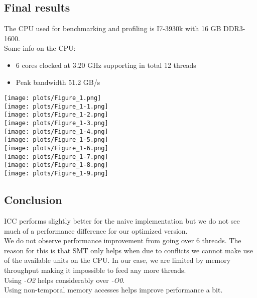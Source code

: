 \documentclass[10pt, fleqn]{article}
\begin{document}
\subsection{Final results}

The CPU used for benchmarking and profiling is I7-3930k with 16 GB DDR3-1600.\\
Some info on the CPU:\\
\begin{itemize}
\item 6 cores clocked at 3.20 GHz supporting in total 12 threads
\item Peak bandwidth 51.2 GB/s
\end{itemize}

\texttt{[image: plots/Figure\_1.png]}\\
\texttt{[image: plots/Figure\_1-1.png]}\\
\texttt{[image: plots/Figure\_1-2.png]}\\
\texttt{[image: plots/Figure\_1-3.png]}\\
\texttt{[image: plots/Figure\_1-4.png]}\\
\texttt{[image: plots/Figure\_1-5.png]}\\
\texttt{[image: plots/Figure\_1-6.png]}\\
\texttt{[image: plots/Figure\_1-7.png]}\\
\texttt{[image: plots/Figure\_1-8.png]}\\
\texttt{[image: plots/Figure\_1-9.png]}\\

\subsection{Conclusion}
ICC performs slightly better for the naive implementation but we do not see much of a performance difference for our optimized version.\\
We do not observe performance improvement from going over 6 threads. The reason for this is that SMT only helps when due to conflicts we cannot make use of the
available units on the CPU. In our case, we are limited by memory throughput making it impossible to feed any more threads.\\
Using \textit{-O2} helps considerably over \textit{-O0}.\\
Using non-temporal memory accesses helps improve performance a bit.

\iffalse
\begin{abstract}
		This is where the abstract goes
\end{abstract}
\fi

\iffalse
\begin{thebibliography}{9}
\bibitem{nano3}
  K. Grove-Rasmussen og Jesper Nygård,
  \emph{Kvantefænomener i Nanosystemer}.
  Niels Bohr Institute \& Nano-Science Center, Københavns Universitet

\end{thebibliography}
\fi
\end{document}
